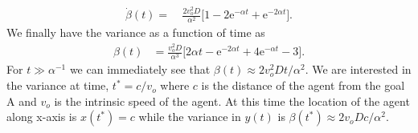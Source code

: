 \documentclass[12pt]{article}
\def\e{\text{e}}
\def\yd{\dot{y}}
\begin{document}
\begin{align}
    \dot{\beta}(t) = & \  \frac{2 v_o^2 D}{\alpha^2} \bigg[ 1 - 2 \e^{-\alpha t} + \e^{-2 \alpha t}\bigg].
\end{align}
We finally have the variance as a function of time as
\begin{align}
    \beta(t) & = \frac{v_o^2 D}{\alpha^3} \bigg[ 2 \alpha t - \e^{-2 \alpha t} + 4 \e^{-\alpha t} - 3 \bigg].
\end{align}
For $t \gg \alpha^{-1}$ we can immediately see that $\beta(t) \approx 2v_o^2 D t/\alpha^2$. We are interested
in the variance at time, $t^* = c/v_o$ where $c$ is the distance of the agent from the goal A and $v_o$
is the intrinsic speed of the agent. At this time the location of the agent along x-axis is $x(t^*)=c$
while the variance in $y(t)$ is $\beta(t^*) \approx 2v_o D c/\alpha^2$.
\end{document}
